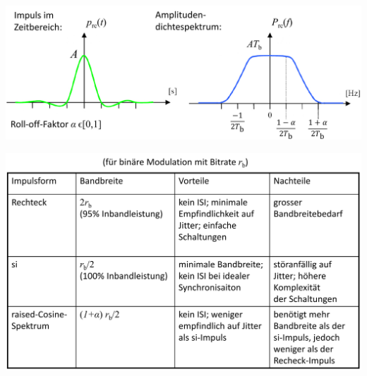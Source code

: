 \begin{center}
	\includegraphics[width=.9\textwidth]{./images/raisedcos.png}
\end{center}

\begin{center}
	\includegraphics[width=.9\textwidth]{./images/vergleich.png}
\end{center}